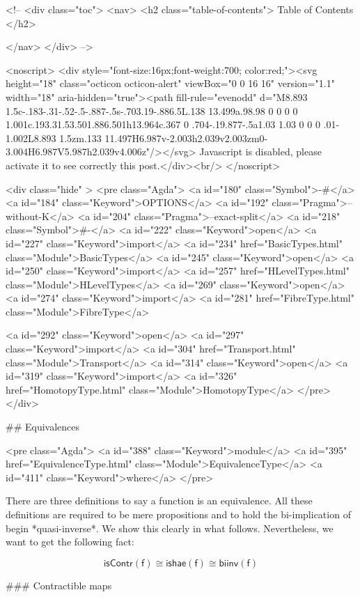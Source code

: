   <!-- 
  <div class="toc">
    <nav>
    <h2 class="table-of-contents"> Table of Contents </h2>
      

    </nav>
  </div>
   -->

  <noscript>
  <div style="font-size:16px;font-weight:700; color:red;"><svg height="18" class="octicon octicon-alert" viewBox="0 0 16 16" version="1.1" width="18" aria-hidden="true"><path fill-rule="evenodd" d="M8.893 1.5c-.183-.31-.52-.5-.887-.5s-.703.19-.886.5L.138 13.499a.98.98 0 0 0 0 1.001c.193.31.53.501.886.501h13.964c.367 0 .704-.19.877-.5a1.03 1.03 0 0 0 .01-1.002L8.893 1.5zm.133 11.497H6.987v-2.003h2.039v2.003zm0-3.004H6.987V5.987h2.039v4.006z"/></svg> Javascript is disabled, please activate it to see correctly this post.</div><br/>
  </noscript>

  <div class="hide" >
<pre class="Agda">
<a id="180" class="Symbol">{-#</a> <a id="184" class="Keyword">OPTIONS</a> <a id="192" class="Pragma">--without-K</a> <a id="204" class="Pragma">--exact-split</a> <a id="218" class="Symbol">#-}</a>
<a id="222" class="Keyword">open</a> <a id="227" class="Keyword">import</a> <a id="234" href="BasicTypes.html" class="Module">BasicTypes</a>
<a id="245" class="Keyword">open</a> <a id="250" class="Keyword">import</a> <a id="257" href="HLevelTypes.html" class="Module">HLevelTypes</a>
<a id="269" class="Keyword">open</a> <a id="274" class="Keyword">import</a> <a id="281" href="FibreType.html" class="Module">FibreType</a>

<a id="292" class="Keyword">open</a> <a id="297" class="Keyword">import</a> <a id="304" href="Transport.html" class="Module">Transport</a>
<a id="314" class="Keyword">open</a> <a id="319" class="Keyword">import</a> <a id="326" href="HomotopyType.html" class="Module">HomotopyType</a>
</pre>
</div>

## Equivalences

<pre class="Agda">
<a id="388" class="Keyword">module</a> <a id="395" href="EquivalenceType.html" class="Module">EquivalenceType</a> <a id="411" class="Keyword">where</a>
</pre>

There are three definitions to say a function is an
equivalence. All these definitions
are required to be mere propositions and to hold
the bi-implication of begin *quasi-inverse*. We show
this clearly in what follows. Nevertheless, we want to get
the following fact:

$$ \mathsf{isContr(f)} \cong \mathsf{ishae(f)} \cong \mathsf{biinv(f)} $$

### Contractible maps

